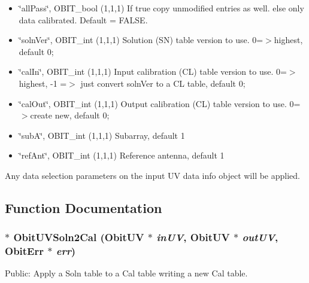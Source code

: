 \begin{itemize}
\item \char`\"{}all\-Pass\char`\"{}, OBIT\_\-bool (1,1,1) If true copy unmodified entries as well. else only data calibrated. Default = FALSE.\end{itemize}
\begin{itemize}
\item \char`\"{}soln\-Ver\char`\"{}, OBIT\_\-int (1,1,1) Solution (SN) table version to use. 0=$>$highest, default 0; \item \char`\"{}cal\-In\char`\"{}, OBIT\_\-int (1,1,1) Input calibration (CL) table version to use. 0=$>$highest, -1 =$>$ just convert soln\-Ver to a CL table, default 0; \item \char`\"{}cal\-Out\char`\"{}, OBIT\_\-int (1,1,1) Output calibration (CL) table version to use. 0=$>$create new, default 0; \item \char`\"{}sub\-A\char`\"{}, OBIT\_\-int (1,1,1) Subarray, default 1 \item \char`\"{}ref\-Ant\char`\"{}, OBIT\_\-int (1,1,1) Reference antenna, default 1\end{itemize}
Any data selection parameters on the input UV data info object will be applied.

\subsection{Function Documentation}
\subsubsection{$\ast$ Obit\-UVSoln2Cal ({\bf Obit\-UV} $\ast$ {\em in\-UV}, {\bf Obit\-UV} $\ast$ {\em out\-UV}, {\bf Obit\-Err} $\ast$ {\em err})}\label{ObitUVSoln2Cal_8h_a0}


Public: Apply a Soln table to a Cal table writing a new Cal table. 

